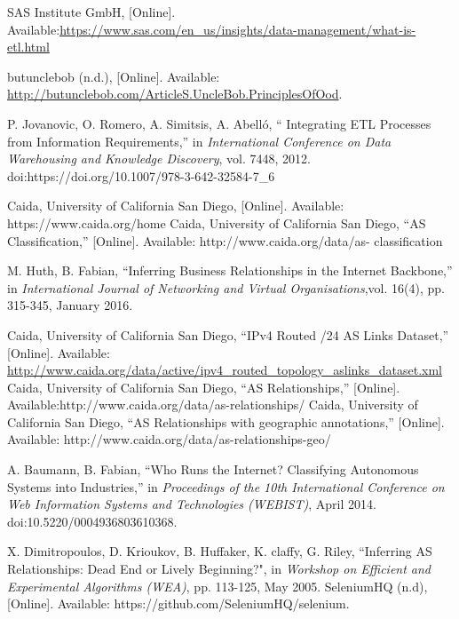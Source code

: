 \documentclass[conference, 11pt]{IEEEtran}
\begin{document}
\begin{thebibliography}{00}
SAS Institute GmbH, [Online]. Available:\url{https://www.sas.com/en_us/insights/data-management/what-is-etl.html} %

 butunclebob (n.d.), [Online]. Available: \url{http://butunclebob.com/ArticleS.UncleBob.PrinciplesOfOod}. %

P. Jovanovic, O. Romero, A. Simitsis, A. Abelló, `` Integrating ETL Processes from Information Requirements,'' in \textit{International Conference on Data Warehousing and Knowledge Discovery}, vol. 7448, 2012. doi:https://doi.org/10.1007/978-3-642-32584-7\_6

Caida, University of California San Diego, [Online]. Available: https://www.caida.org/home %
Caida, University of California San Diego, ``AS Classification,'' [Online]. Available: http://www.caida.org/data/as-
classification %

 M. Huth, B. Fabian, ``Inferring Business Relationships in the Internet Backbone,'' in \textit{International Journal of Networking and Virtual Organisations},vol. 16(4), pp. 315-345, January 2016. %

 Caida, University of California San Diego, ``IPv4 Routed /24 AS Links Dataset,'' [Online]. Available: \url{http://www.caida.org/data/active/ipv4\_routed\_topology\_aslinks\_dataset.xml} %
Caida, University of California San Diego, ``AS Relationships,'' [Online]. Available:http://www.caida.org/data/as-relationships/ %
Caida, University of California San Diego, ``AS Relationships with geographic annotations,'' [Online]. Available: http://www.caida.org/data/as-relationships-geo/ %


 A. Baumann, B. Fabian, ``Who Runs the Internet? Classifying Autonomous Systems into Industries,'' in \textit{Proceedings of the 10th International Conference on Web Information Systems and Technologies (WEBIST)}, April 2014. doi:10.5220/0004936803610368. %



 X. Dimitropoulos, D. Krioukov, B. Huffaker, K. claffy, G. Riley, ``Inferring AS Relationships: Dead End or Lively Beginning?", in \textit{Workshop on Efficient and Experimental Algorithms (WEA)}, pp. 113-125, May 2005. %
SeleniumHQ (n.d), [Online]. Available: https://github.com/SeleniumHQ/selenium. %


\end{thebibliography}
\end{document}
